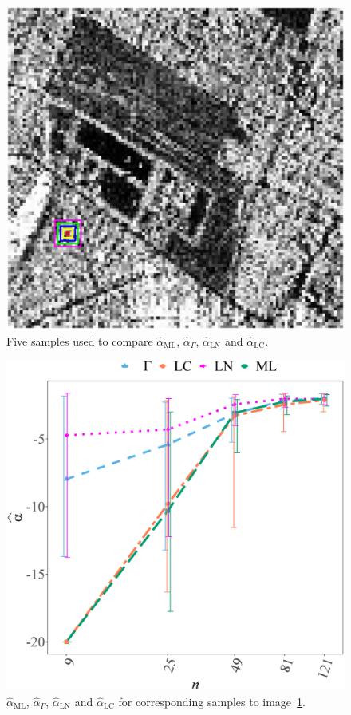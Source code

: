\documentclass[twocolumn]{svjour3}
\begin{document}
\begin{figure}[hbt]
\begin{center}
\includegraphics[width=0.9\linewidth]{../Figures/CincoMuestras2}
\caption{Five samples used to compare $\widehat{\alpha}_{\text{{ML}}}$, $\widehat{\alpha}_{\Gamma}$, $\widehat{\alpha}_{\text{{LN}}}$ and  $\widehat{\alpha}_{\text{{LC}}}$.}\label{CincoMuestras}
\end{center}
\end{figure}

\begin{figure}[hbt]
\centering
\includegraphics[width=0.8\linewidth]{../Figures/AlfaVsTamCincoMuestrasCorregido_v2}
\caption{ $\widehat{\alpha}_{\text{{ML}}}$, $\widehat{\alpha}_{\Gamma}$, $\widehat{\alpha}_{\text{{LN}}}$ and $\widehat{\alpha}_{\text{{LC}}}$ for corresponding samples to image~\ref{CincoMuestras}.}\label{AlfaVsTamCincoMuestras}
\end{figure}
\end{document}

